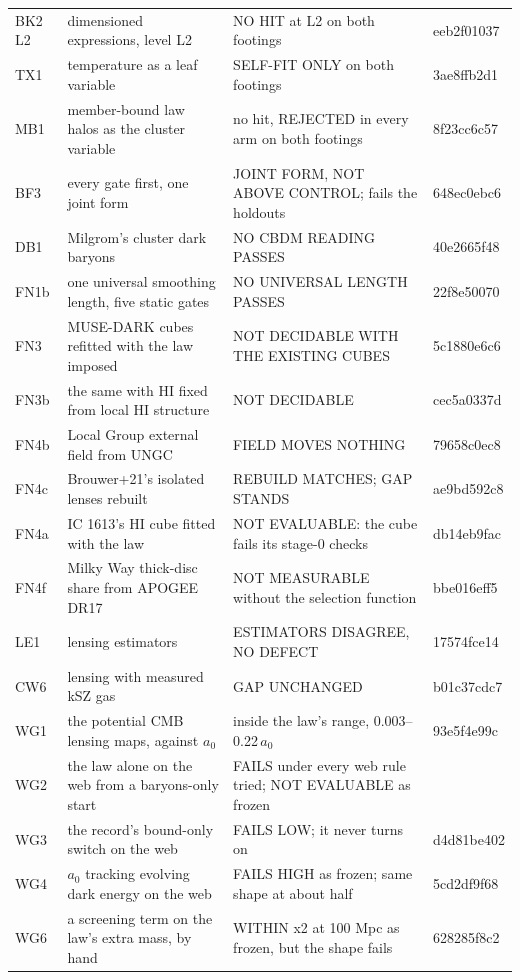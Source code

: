 \documentclass[10pt]{article}
\begin{document}
\begin{table}[!htbp]
\begin{tabular}{>{\raggedright\arraybackslash}p{1.9cm}>{\raggedright\arraybackslash}p{4.4cm}>{\raggedright\arraybackslash}p{6.2cm}>{\raggedright\arraybackslash}p{2.2cm}}
BK2 L2 & dimensioned expressions, level L2 & NO HIT at L2 on both footings & eeb2f01037\\
TX1 & temperature as a leaf variable & SELF-FIT ONLY on both footings & 3ae8ffb2d1\\
MB1 & member-bound law halos as the cluster variable & no hit, REJECTED in every arm on both footings & 8f23cc6c57\\
BF3 & every gate first, one joint form & JOINT FORM, NOT ABOVE CONTROL; fails the holdouts & 648ec0ebc6\\
DB1 & Milgrom's cluster dark baryons & NO CBDM READING PASSES & 40e2665f48\\
FN1b & one universal smoothing length, five static gates & NO UNIVERSAL LENGTH PASSES & 22f8e50070\\
FN3 & MUSE-DARK cubes refitted with the law imposed & NOT DECIDABLE WITH THE EXISTING CUBES & 5c1880e6c6\\
FN3b & the same with HI fixed from local HI structure & NOT DECIDABLE & cec5a0337d\\
FN4b & Local Group external field from UNGC & FIELD MOVES NOTHING & 79658c0ec8\\
FN4c & Brouwer+21's isolated lenses rebuilt & REBUILD MATCHES; GAP STANDS & ae9bd592c8\\
FN4a & IC 1613's HI cube fitted with the law & NOT EVALUABLE: the cube fails its stage-0 checks & db14eb9fac\\
FN4f & Milky Way thick-disc share from APOGEE DR17 & NOT MEASURABLE without the selection function & bbe016eff5\\
LE1 & lensing estimators & ESTIMATORS DISAGREE, NO DEFECT & 17574fce14\\
CW6 & lensing with measured kSZ gas & GAP UNCHANGED & b01c37cdc7\\
WG1 & the potential CMB lensing maps, against $a_0$ & inside the law's range, 0.003--0.22\,$a_0$ & 93e5f4e99c\\
WG2 & the law alone on the web from a baryons-only start & FAILS under every web rule tried; NOT EVALUABLE as frozen & 6856666719\\
WG3 & the record's bound-only switch on the web & FAILS LOW; it never turns on & d4d81be402\\
WG4 & $a_0$ tracking evolving dark energy on the web & FAILS HIGH as frozen; same shape at about half & 5cd2df9f68\\
WG6 & a screening term on the law's extra mass, by hand & WITHIN x2 at 100 Mpc as frozen, but the shape fails & 628285f8c2\\

\end{tabular}
\end{table}
\end{document}
